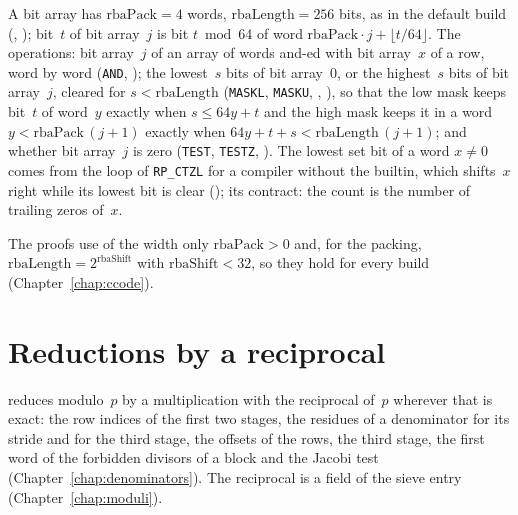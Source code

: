 \begin{definition}\label{def:bitArrays}
  \leanok
  A bit array has $\mathrm{rbaPack} = 4$ words, $\mathrm{rbaLength} = 256$ bits, as in the default
  build (, ); bit~$t$ of bit
  array~$j$ is bit $t \bmod 64$ of word $\mathrm{rbaPack} \cdot j + \lfloor t/64 \rfloor$. The
  operations: bit array~$j$ of an array of words and-ed with bit array~$x$ of a row, word by word
  (\verb|AND|, ); the lowest~$s$ bits of bit array~$0$, or the
  highest~$s$ bits of bit array~$j$, cleared for $s < \mathrm{rbaLength}$ (\verb|MASKL|,
  \verb|MASKU|, , ), so that the low
  mask keeps bit~$t$ of word~$y$ exactly when $s \le 64 y + t$ and the high mask keeps it in a word
  $y < \mathrm{rbaPack}\,(j + 1)$ exactly when $64 y + t + s < \mathrm{rbaLength}\,(j + 1)$; and
  whether bit array~$j$ is zero (\verb|TEST|, \verb|TESTZ|, ). The
  lowest set bit of a word $x \ne 0$ comes from the loop of \verb|RP_CTZL| for a compiler without
  the builtin, which shifts~$x$ right while its lowest bit is clear
  (); its contract: the count is the number of trailing zeros
  of~$x$.
\end{definition}

The proofs use of the width only $\mathrm{rbaPack} > 0$ and, for the packing, $\mathrm{rbaLength} =
2^{\mathrm{rbaShift}}$ with $\mathrm{rbaShift} < 32$, so they hold for every build
(Chapter~\ref{chap:ccode}).

\section{Reductions by a reciprocal}\label{sec:reciprocal}

\ratpoints{} reduces modulo~$p$ by a multiplication with the reciprocal of~$p$ wherever that is exact:
the row indices of the first two stages, the residues of a denominator for its stride and for the
third stage, the offsets of the rows, the third stage, the first word of the forbidden divisors of
a block and the Jacobi test (Chapter~\ref{chap:denominators}). The reciprocal is a field of the
sieve entry (Chapter~\ref{chap:moduli}).


